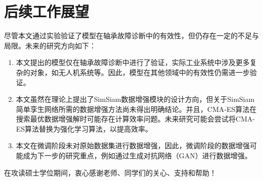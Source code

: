 \documentclass[master]{thesis-uestc}
\begin{document}
\section{后续工作展望}
尽管本文通过实验验证了模型在轴承故障诊断中的有效性，但仍存在一定的不足与局限。未来的研究方向如下：

\begin{enumerate}[label={(\arabic*)}]
    \item 本文提出的模型仅在轴承故障诊断中进行了验证，实际工业系统中涉及更多复杂的对象，如无人机系统等。因此，模型在其他领域中的有效性仍需进一步验证。
    \item 本文虽然在理论上提出了SimSiam数据增强模块的设计方向，但关于SimSiam简单孪生网络所需的数据增强方法尚未得出明确结论。并且，CMA-ES算法在搜索最优数据增强解时可能存在计算效率问题。未来研究可能会尝试将CMA-ES算法替换为强化学习算法，以提高效率。
    \item 本文在微调阶段未对原始数据集进行数据增强，因此，微调阶段的数据增强可能成为下一步的研究重点，例如通过生成对抗网络（GAN）进行数据增强。
\end{enumerate}

\thesisacknowledgement
在攻读硕士学位期间，衷心感谢老师、同学们的关心、支持和帮助！

\thesisappendix



%
% 
%
% 
% 
%

\end{document}
